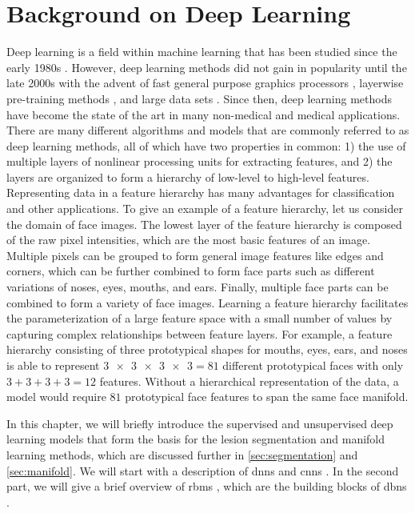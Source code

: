\chapter{Background on Deep Learning}
\label{sec:background}

Deep learning is a field within machine learning that has been studied since the
early 1980s \citep{fukushima1980}. However, deep learning methods did not gain
in popularity until the late 2000s with the advent of fast general purpose
graphics processors \citep{raina2009}, layerwise pre-training methods
\citep{hinton2006b,hinton2006c}, and large data sets
\citep{deng2009,krizhevsky2012}. Since then, deep learning methods have become
the state of the art in many non-medical \citep{krizhevsky2012,sainath2013} and
medical \citep{ciresan2012,kamnitsas2015} applications. There are many different
algorithms and models that are commonly referred to as deep learning methods,
all of which have two properties in common: 1) the use of multiple layers of
nonlinear processing units for extracting features, and 2) the layers are
organized to form a hierarchy of low-level to high-level features. Representing
data in a feature hierarchy has many advantages for classification and other
applications. To give an example of a feature hierarchy, let us consider the
domain of face images. The lowest layer of the feature hierarchy is composed of
the raw pixel intensities, which are the most basic features of an image.
Multiple pixels can be grouped to form general image features like edges and
corners, which can be further combined to form face parts such as different
variations of noses, eyes, mouths, and ears.
Finally, multiple face parts can be combined to form a variety of face images.
Learning a feature hierarchy facilitates the parameterization of a large feature
space with a small number of values by capturing complex relationships between
feature layers. For example, a feature hierarchy consisting of three
prototypical shapes for mouths, eyes, ears, and noses is able to represent
$\num{3x3x3x3} = 81$ different prototypical faces with only $3+3+3+3=12$
features. Without a hierarchical representation of the data, a model would
require $81$ prototypical face features to span the same face manifold.

In this chapter, we will briefly introduce the supervised and unsupervised deep
learning models that form the basis for the lesion segmentation and manifold
learning methods, which are discussed further in \ref{sec:segmentation} and
\ref{sec:manifold}. We will start with a description of \glspl{dnn}
\citep{farley1954,werbos1974,rumelhart1986} and \glspl{cnn}
\citep{fukushima1980,lecun1989,lecun1998}. In the second part, we will give a
brief overview of \glspl{rbm} \citep{freund1992,hinton2010a}, which are the
building blocks of \glspl{dbn} \citep{hinton2006b}.

